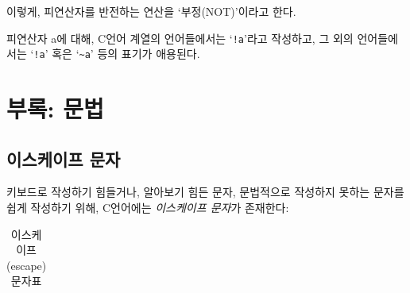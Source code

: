 \documentclass[a4paper,12pt]{book}
\newcommand{\V}[1]{\Verb|#1|}
\begin{document}
\begin{appendices}
        이렇게, 피연산자를 반전하는 연산을 `부정(NOT)'이라고 한다.

        피연산자 a에 대해, C언어 계열의 언어들에서는 `\V{!a}'라고 작성하고,
        그 외의 언어들에서는 `\V{!a}' 혹은 `\V{~a}' 등의 표기가 애용된다.


\chapter{부록: 문법}


\section{이스케이프 문자}
\label{sec:escapes}

키보드로 작성하기 힘들거나, 알아보기 힘든 문자,
문법적으로 작성하지 못하는 문자를 쉽게 작성하기 위해,
C언어에는 \textit{이스케이프 문자}가 존재한다:

\begingroup
    \centering
    \begin{longtable}{ || m{6em} | m{10em} | m{13em} || }
        \caption{이스케이프(escape) 문자표}


\end{longtable}
\end{appendices}
\end{document}
